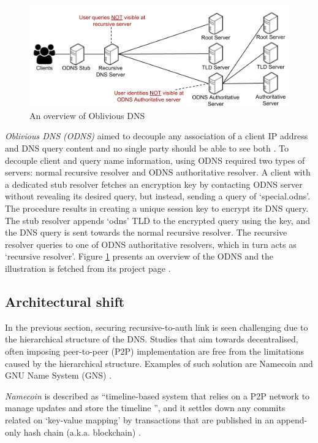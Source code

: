 \begin{figure}[h!]
    \begin{center}
    \includegraphics*[width=0.9\columnwidth]{img/ODNSoverview}
    \end{center}
    \caption{An overview of Oblivious DNS \cite{ODNSwebsite}}
    \label{odnsoverview}
\end{figure}
\textit{Oblivious DNS (ODNS)} aimed to decouple any association of a client IP address and DNS query content and no single party should be able to see both \cite{annee-dprive-oblivious-dns-00}.
To decouple client and query name information, using ODNS required two types of servers: normal recursive resolver and ODNS authoritative resolver.
A client with a dedicated stub resolver fetches an encryption key by contacting ODNS server without revealing its desired query, but instead, sending a query of `special.odns'.
The procedure results in creating a unique session key to encrypt its DNS query. The stub resolver appends `odns' TLD to the encrypted query using the key, and the DNS query is sent towards the normal recursive resolver. The recursive resolver queries to one of ODNS authoritative resolvers, which in turn acts as `recursive resolver'.
Figure \ref{odnsoverview} presents an overview of the ODNS and the illustration is fetched from its project page \cite{ODNSwebsite}.

\subsection{Architectural shift}
In the previous section, securing recursive-to-auth link is seen challenging due to the hierarchical structure of the DNS.
Studies that aim towards decentralised, often imposing peer-to-peer (P2P) implementation are free from the limitations caused by the hierarchical structure.
Examples of such solution are Namecoin \cite{loibl2014namecoin} and GNU Name System (GNS) \cite{grothoff2017nsa, wachs2014censorship}.

\textit{Namecoin} \cite{loibl2014namecoin} is described as ``timeline-based system that relies on a P2P network to manage updates and store the timeline \cite{grothoff2017nsa}'', and it settles down any commits related on `key-value mapping' by transactions that are published in an append-only hash chain (a.k.a. blockchain) \cite{kalodner2015empirical}.

